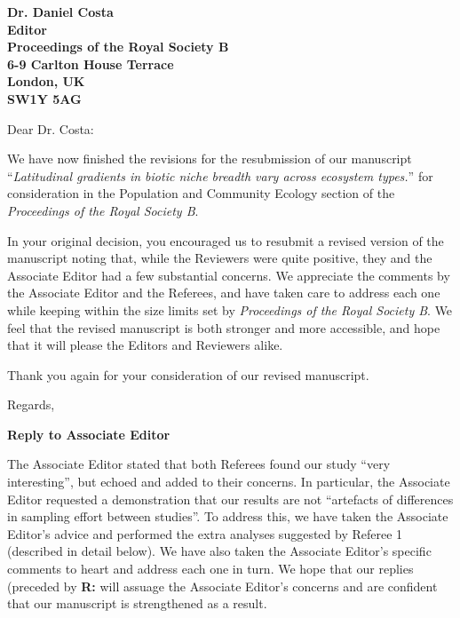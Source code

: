 \documentclass[12pt]{letter}
\newcommand{\mytitle}{\emph{Latitudinal gradients in biotic niche breadth vary across ecosystem types.}}
\newcommand{\myjournal}{\emph{Proceedings of the Royal Society B}}
\begin{document}
\begin{letter}{\bf Dr. Daniel Costa\\
               Editor\\
               Proceedings of the Royal Society B\\
               6-9 Carlton House Terrace\\
               London, UK\\
               SW1Y 5AG\\
                }

\opening{Dear Dr. Costa:}

We have now finished the revisions for the resubmission of our manuscript
``\mytitle'' for consideration in the Population and Community Ecology section
of the \myjournal. 

In your original decision, you encouraged us to resubmit a revised version of
the manuscript noting that, while the Reviewers were quite positive, they and
the Associate Editor had a few substantial concerns. We appreciate the
comments by the Associate Editor and the Referees, and have taken care to
address each one while keeping within the size limits set by \myjournal. We
feel that the revised manuscript is both stronger and more accessible, and
hope that it will please the Editors and Reviewers alike.


Thank you again for your consideration of our revised manuscript.

\closing{Regards,}


\end{letter}

\newpage

\setcounter{page}{1}


{\Large \bf Reply to Associate Editor}

  The Associate Editor stated that both Referees found our study ``very
  interesting'', but echoed and added to their concerns. In particular, the
  Associate Editor requested a demonstration that our results are not
  ``artefacts of differences in sampling effort between studies''. To address
  this, we have taken the Associate Editor's advice and performed the extra
  analyses suggested by Referee 1 (described in detail below). We have also
  taken the Associate Editor's specific comments to heart and address each one
  in turn. We hope that our replies (preceded by \textbf{R:} 
  will assuage the Associate Editor's concerns and are 
  confident that our manuscript is strengthened as a result.
\end{document}
